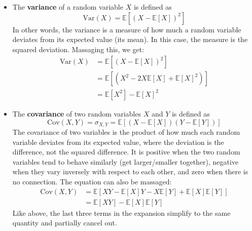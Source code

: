 \documentclass{article}
\begin{document}
\begin{itemize}
    \item The \textbf{variance} of a random variable $X$ is defined as
    \begin{equation}
        \text{Var}(X) = \mathbb{E}[(X - \mathbb{E}[X])^2]
    \end{equation}
   In other words, the variance is a measure of how much a random variable deviates from its expected value (its mean). In this case, the measure is the squared deviation. Massaging this, we get:
   \begin{equation}
    \begin{split}
        \text{Var}(X) &= \mathbb{E}[(X - \mathbb{E}[X])^2] \\ &= \mathbb{E}[(X^2 - 2X\mathbb{E}[X] + \mathbb{E}[X]^2)] \\ &= \mathbb{E}[X^2] - \mathbb{E}[X]^2
    \end{split}
    \end{equation}
    
    \item The \textbf{covariance} of two random variables $X$ and $Y$ is defined as
    \begin{equation}
        \text{Cov}(X, Y) = \sigma_{X,Y} = \mathbb{E}[(X - \mathbb{E}[X])(Y - \mathbb{E}[Y])]
    \end{equation}
    The covariance of two variables is the product of how much each random variable deviates from its expected value, where the deviation is the difference, not the squared difference. It is positive when the two random variables tend to behave similarly (get larger/smaller together), negative when they vary inversely with respect to each other, and zero when there is no connection. The equation can also be massaged:
    \begin{equation}
    \begin{split}
        \text{Cov}(X, Y) &= \mathbb{E}[XY - \mathbb{E}[X]Y - X\mathbb{E}[Y] + \mathbb{E}[X]\mathbb{E}[Y]] \\ &=  \mathbb{E}[XY] - \mathbb{E}[X]\mathbb{E}[Y]
    \end{split}
    \end{equation}
    Like above, the last three terms in the expansion simplify to the same quantity and partially cancel out.
\end{itemize}
\end{document}
